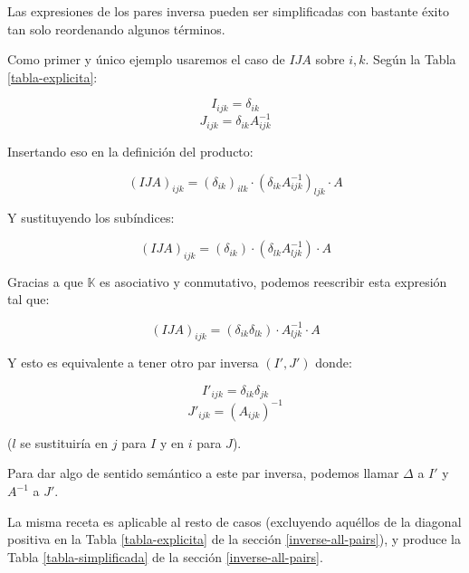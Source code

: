Las expresiones de los pares inversa pueden ser simplificadas con bastante éxito tan solo reordenando algunos términos.

Como primer y único ejemplo usaremos el caso de $IJA$ sobre $i, k$. Según la Tabla \ref{tabla-explicita}:

$$I_{ijk} = \delta_{ik}$$
$$J_{ijk} = \delta_{ik} A_{ijk}^{-1}$$

Insertando eso en la definición del producto:

$$(IJA)_{ijk} = (\delta_{ik})_{ilk} \cdot (\delta_{ik} A_{ijk}^{-1})_{ljk} \cdot A$$

Y sustituyendo los subíndices:

$$(IJA)_{ijk} = (\delta_{ik}) \cdot (\delta_{lk} A_{ljk}^{-1}) \cdot A$$

\newpage

Gracias a que $\mathbb{K}$ es asociativo y conmutativo, podemos reescribir esta expresión tal que:

$$(IJA)_{ijk} = (\delta_{ik} \delta_{lk}) \cdot A_{ljk}^{-1} \cdot A$$

Y esto es equivalente a tener otro par inversa $(I', J')$ donde:

$$I'_{ijk} = \delta_{ik} \delta_{jk}$$
$$J'_{ijk} = (A_{ijk})^{-1}$$

($l$ se sustituiría en $j$ para $I$ y en $i$ para $J$).

Para dar algo de sentido semántico a este par inversa, podemos llamar $\Delta$ a $I'$ y $A^{-1}$ a $J'$.

La misma receta es aplicable al resto de casos (excluyendo aquéllos de la diagonal positiva en la Tabla \ref{tabla-explicita} de la sección \ref{inverse-all-pairs}), y produce la Tabla \ref{tabla-simplificada} de la sección \ref{inverse-all-pairs}.

